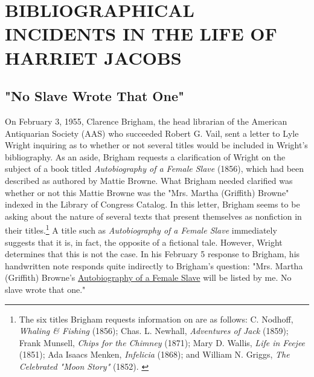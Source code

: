 %
%
%
%

\chapter{BIBLIOGRAPHICAL INCIDENTS IN THE LIFE OF HARRIET JACOBS}

\section{"No Slave Wrote That One"}
On February 3, 1955, Clarence Brigham, the head librarian of the American Antiquarian Society (AAS) who succeeded Robert G. Vail, sent a letter to Lyle Wright inquiring as to whether or not several titles would be included in Wright's bibliography.\autocite{clarence_s._brigham_letter_1955} As an aside, Brigham requests a clarification of Wright on the subject of a book titled \textit{Autobiography of a Female Slave} (1856), which had been described as authored by Mattie Browne. What Brigham needed clarified was whether or not this Mattie Browne was the "Mrs. Martha (Griffith) Browne" indexed in the Library of Congress Catalog. In this letter, Brigham seems to be asking about the nature of several texts that present themselves as nonfiction in their titles.\footnote{The six titles Brigham requests information on are as follows: C. Nodhoff, \textit{Whaling \& Fishing} (1856); Chas. L. Newhall, \textit{Adventures of Jack} (1859); Frank Munsell, \textit{Chips for the Chimney} (1871); Mary D. Wallis, \textit{Life in Feejee} (1851); Ada Isaacs Menken, \textit{Infelicia} (1868); and William N. Griggs, \textit{The Celebrated "Moon Story"} (1852). \autocite{clarence_s._brigham_letter_1955}} A title such as \textit{Autobiography of a Female Slave} immediately suggests that it is, in fact, the opposite of a fictional tale. However, Wright determines that this is not the case. In his February 5 response to Brigham, his handwritten note responds quite indirectly to Brigham's question: "Mrs. Martha (Griffith) Browne's \underline{Autobiography of a Female Slave} will be listed by me. No slave wrote that one."\autocite{lyle_h._wright_letter_1955}

